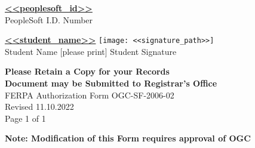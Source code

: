 \documentclass[12pt]{article}
\begin{document}
\vspace{0.6cm}
\underline{\textbf{<<peoplesoft_id>>}}\\
PeopleSoft I.D. Number

\vspace{0.3cm}
\underline{\textbf{<<student_name>>}} \hspace{0.5cm}
\texttt{[image: <<signature\_path>>]}\\
Student Name [please print] \hspace{2cm} Student Signature

\vspace{0.6cm}
\textbf{Please Retain a Copy for your Records}\\
\textbf{Document may be Submitted to Registrar’s Office}\\
FERPA Authorization Form OGC-SF-2006-02\\
Revised 11.10.2022\\
Page 1 of 1

\vfill
\hfill \textbf{Note: Modification of this Form requires approval of OGC}
\end{document}
